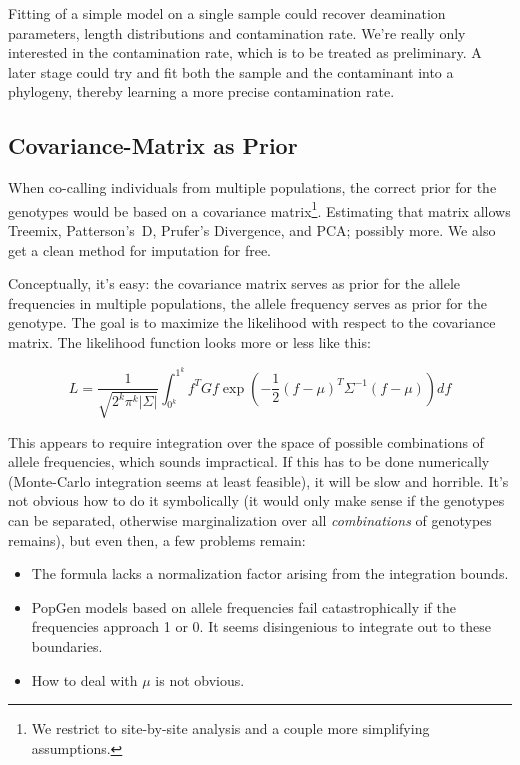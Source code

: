 \documentclass{article}
\begin{document}
Fitting of a simple model on a single sample could recover deamination
parameters, length distributions and contamination rate.  We're really
only interested in the contamination rate, which is to be treated as
preliminary.  A later stage could try and fit both the sample and the
contaminant into a phylogeny, thereby learning a more precise
contamination rate.

\subsection{Covariance-Matrix as Prior}

When co-calling individuals from multiple populations, the correct prior
for the genotypes would be based on a covariance matrix\footnote{We
restrict to site-by-site analysis and a couple more simplifying
assumptions.}.  Estimating that matrix allows Treemix, Patterson's~D,
Pr\:ufer's Divergence, and PCA; possibly more.   We also get a clean
method for imputation for free.

Conceptually, it's easy:  the covariance matrix serves as prior for the
allele frequencies in multiple populations, the allele frequency serves
as prior for the genotype.  The goal is to maximize the likelihood with
respect to the covariance matrix.  The likelihood function looks more or
less like this:

\begin{equation*}
L = \frac{1}{\sqrt{2^k \pi^k |\Sigma|}} \int_{0^k}^{1^k} f^T G f 
    \exp \left( -\frac{1}{2}(f-\mu)^T \Sigma^{-1} (f-\mu) \right) df
\end{equation*}    

This appears to require integration over the space of possible
combinations of allele frequencies, which sounds impractical.  If this
has to be done numerically (Monte-Carlo integration seems at least
feasible), it will be slow and horrible.  It's not obvious how to do it
symbolically (it would only make sense if the genotypes can be
separated, otherwise marginalization over all \emph{combinations} of
genotypes remains), but even then, a few problems remain:

\begin{itemize}
\item The formula lacks a normalization factor arising from the
integration bounds.
\item PopGen models based on allele frequencies fail catastrophically if
the frequencies approach 1 or 0.  It seems disingenious to integrate out
to these boundaries.
\item How to deal with $\mu$ is not obvious.
\end{itemize}
\end{document}
